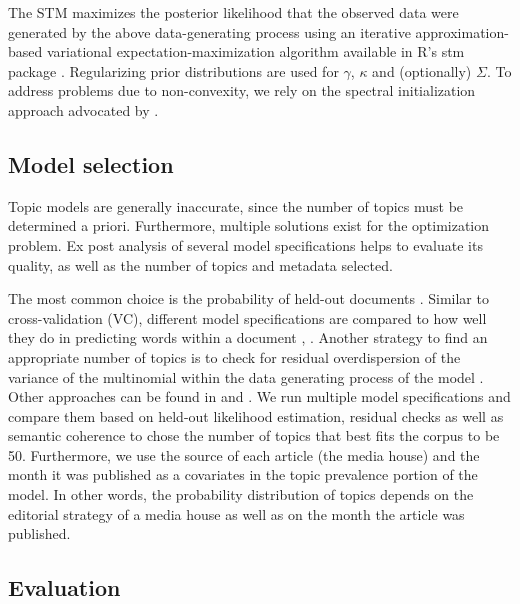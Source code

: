 \documentclass[12pt,a4paper,notitlepage]{article}
\begin{document}
The STM maximizes the posterior likelihood that the observed data were generated by the above data-generating process using an iterative approximation-based variational expectation-maximization algorithm available in R's stm package \citep{roberts_stm:_2016}. Regularizing prior distributions are used for $\gamma$, $\kappa$ and (optionally) $\Sigma$. To address problems due to non-convexity, we rely on the spectral initialization approach advocated by \citet{roberts_navigating_2016}.

\subsection{Model selection}

Topic models are generally inaccurate, since the number of topics must be determined a priori. Furthermore, multiple solutions exist for the optimization problem. Ex post analysis of several model specifications helps to evaluate its quality, as well as the number of topics and metadata selected. 

The most common choice is the probability of held-out documents \citep{grimmer_bayesian_2010}. Similar to cross-validation (VC), different model specifications are compared to how well they do in predicting words within a document \citep{asuncion_smoothing_2012}, \citep{wallach_evaluation_2009}. Another strategy to find an appropriate number of topics is to check for residual overdispersion of the variance of the multinomial within the data generating process of the model \citep{taddy_estimation_2012}. Other approaches can be found in \citet{airoldi_reconceptualizing_2010} and \citet{teh_hierarchical_2006}. We run multiple model specifications and compare them based on held-out likelihood estimation, residual checks as well as semantic coherence to chose the number of topics that best fits the corpus to be 50. Furthermore, we use the source of each article (the media house) and the month it was published as a covariates in the topic prevalence portion of the model. In other words, the probability distribution of topics depends on the editorial strategy of a media house as well as on the month the article was published. 

\subsection{Evaluation}
\end{document}
